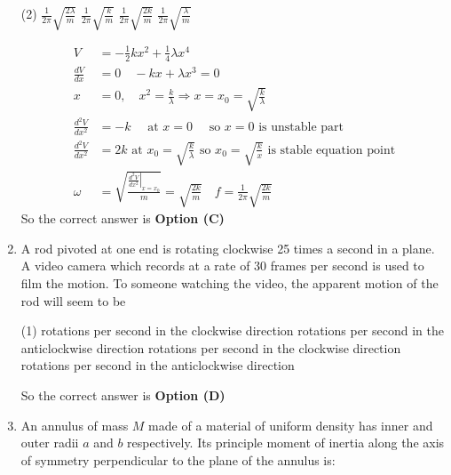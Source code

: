 \begin{enumerate}
\begin{tasks}(2)
\task[\textbf{A.}] $\frac{1}{2 \pi} \sqrt{\frac{2 \lambda}{m}}$
\task[\textbf{B.}] $\frac{1}{2 \pi} \sqrt{\frac{k}{m}}$
\task[\textbf{C.}] $\frac{1}{2 \pi} \sqrt{\frac{2 k}{m}}$
\task[\textbf{D.}] $\frac{1}{2 \pi} \sqrt{\frac{\lambda}{m}}$
\end{tasks}
\begin{answer}
\begin{align*}
V&=-\frac{1}{2} k x^{2}+\frac{1}{4} \lambda x^{4}\\
\frac{d V}{d x}&=0 \quad-k x+\lambda x^{3}=0\\
x&=0, \quad x^{2}=\frac{k}{\lambda} \Rightarrow x=x_{0}=\sqrt{\frac{k}{\lambda}}\\
\frac{d^{2} V}{d x^{2}}&=-k \quad\text{ at $x=0 \quad$ so $x=0$ is unstable part}\\
\frac{d^{2} V}{d x^{2}}&=2 k\text{ at $x_{0}=\sqrt{\frac{k}{\lambda}}$ so $x_{0}=\sqrt{\frac{k}{x}}$ is stable equation point}\\
\omega&=\sqrt{\frac{\left.\frac{d^{2} V}{d x^{2}}\right|_{x=x_{0}}}{m}}=\sqrt{\frac{2 k}{m}} \quad f=\frac{1}{2 \pi} \sqrt{\frac{2 k}{m}}
\end{align*}
So the correct answer is \textbf{Option (C)}
\end{answer}
	\item A rod pivoted at one end is rotating clockwise 25 times a second in a plane. A video camera which records at a rate of 30 frames per second is used to film the motion. To someone watching the video, the apparent motion of the rod will seem to be

\begin{tasks}(1)
 rotations per second in the clockwise direction
 rotations per second in the anticlockwise direction
 rotations per second in the clockwise direction
 rotations per second in the anticlockwise direction
\end{tasks}
\begin{answer}
So the correct answer is \textbf{Option (D)}
\end{answer}
	\item An annulus of mass $M$ made of a material of uniform density has inner and outer radii $a$ and $b$ respectively. Its principle moment of inertia along the axis of symmetry perpendicular to the plane of the annulus is:


\end{enumerate}
